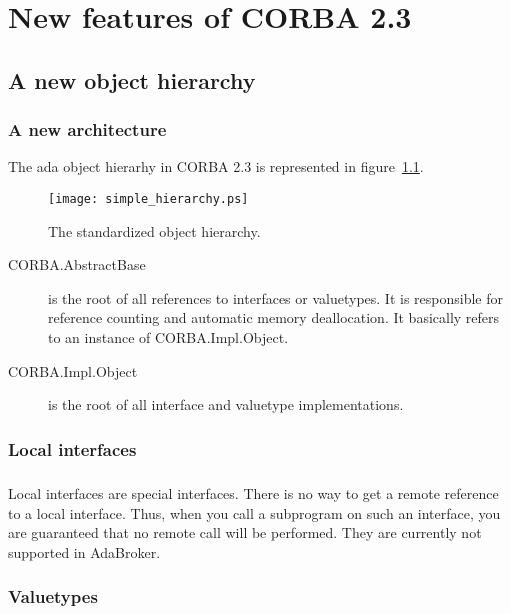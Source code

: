 \chapter{New features of CORBA 2.3}

\section{A new object hierarchy}


\subsection{A new architecture}
The ada object hierarhy in CORBA 2.3 is represented in
figure~\ref{fig::simple_hierarchy}.


\vspace{2mm}
\begin{figure}[!htbp]
    \texttt{[image: simple\_hierarchy.ps]}
  \caption{The standardized object hierarchy.}
  \label{fig::simple_hierarchy}
\end{figure}

\begin{description}
\item[CORBA.AbstractBase] is the root of all references to interfaces or
valuetypes. It is responsible for reference counting and automatic
memory deallocation. It basically refers to an instance of CORBA.Impl.Object.

\item[CORBA.Impl.Object] is the root of all interface and valuetype implementations.
\end{description}

\subsection{Local interfaces}
\paragraph{}Local interfaces are special interfaces. There is no way
to get a remote reference to a local interface. Thus, when you call a
subprogram on such an interface, you are guaranteed that no remote
call will be performed. They are currently not supported in AdaBroker.

\subsection{Valuetypes}
